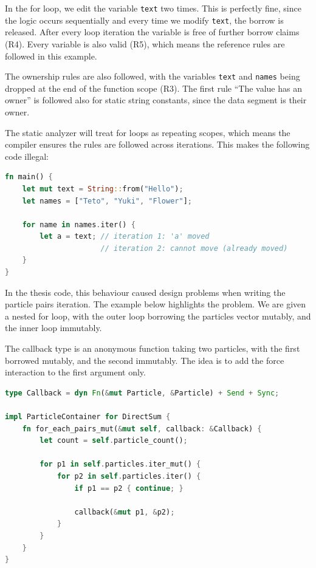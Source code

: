 \documentclass[11pt,
               a4paper,
               bibtotoc,
               idxtotoc,
               headsepline,
               footsepline,
               footexclude,
               BCOR12mm,
               DIV13,
               openany,   %
               ]
               {scrbook}
\begin{document}
In the for loop, we edit the variable \texttt{text} two times. This is perfectly fine, since the logic occurs sequentially and every time we modify \texttt{text}, the borrow is released. After every loop iteration the variable is free of further borrow claims (R4). Every variable is also valid (R5), which means the reference rules are followed in this example.

The ownership rules are also followed, with the variables \texttt{text} and \texttt{names} being dropped at the end of the function scope (R3). The first rule ``The value has an owner'' is followed also for static string constants, since the data segment is their owner.

The static analyzer will treat for loops as repeating scopes, which means the compiler ensures the rules are followed across iterations. This makes the following code illegal:

\vspace{0.5em}
\begin{lstlisting}[style=eclipse-rust, language=Rust, basicstyle=\ttfamily\small]
fn main() {
    let mut text = String::from("Hello");
    let names = ["Teto", "Yuki", "Flower"];

    for name in names.iter() {
        let a = text; // iteration 1: 'a' moved
                      // iteration 2: cannot move (already moved)
    }
}
\end{lstlisting}

In the thesis code, this behaviour caused design problems when writing the particle pairs iteration. The example below highlights the problem. We are given a nested for loop, with the outer loop borrowing the particles vector mutably, and the inner loop immutably.

The callback type is an anonymous function taking two particles, with the first borrowed mutably, and the second immutably. The idea is to add the force interaction to the first argument only.

\vspace{0.5em}
\begin{lstlisting}[style=eclipse-rust, language=Rust, basicstyle=\ttfamily\small, caption={First approach at DirectSum particle pairs iteration.}]
type Callback = dyn Fn(&mut Particle, &Particle) + Send + Sync;

impl ParticleContainer for DirectSum {
    fn for_each_pairs_mut(&mut self, callback: &Callback) {
        let count = self.particle_count();

        for p1 in self.particles.iter_mut() {
            for p2 in self.particles.iter() {
                if p1 == p2 { continue; }

                callback(&mut p1, &p2);
            }
        }
    }
}
\end{lstlisting}
\end{document}
